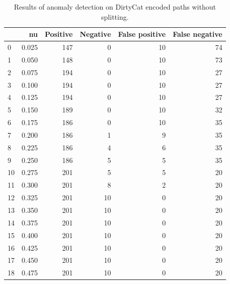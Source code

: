 \documentclass[a4paper,twoside,12pt]{book}
\begin{document}
\begin{appendices}
\begin{table}
	\centering
	\caption{Results of anomaly detection on DirtyCat encoded paths without splitting.}
	\label{id:tab:ocsvmOnDirtyCatFullPaths}
	\begin{tabular}{lrrrrr}
		\toprule
		{} &     nu &  Positive &  Negative &  False positive &  False negative \\
		\midrule
		0  &  0.025 &       147 &         0 &              10 &              74 \\
		1  &  0.050 &       148 &         0 &              10 &              73 \\
		2  &  0.075 &       194 &         0 &              10 &              27 \\
		3  &  0.100 &       194 &         0 &              10 &              27 \\
		4  &  0.125 &       194 &         0 &              10 &              27 \\
		5  &  0.150 &       189 &         0 &              10 &              32 \\
		6  &  0.175 &       186 &         0 &              10 &              35 \\
		7  &  0.200 &       186 &         1 &               9 &              35 \\
		8  &  0.225 &       186 &         4 &               6 &              35 \\
		9  &  0.250 &       186 &         5 &               5 &              35 \\
		10 &  0.275 &       201 &         5 &               5 &              20 \\
		11 &  0.300 &       201 &         8 &               2 &              20 \\
		12 &  0.325 &       201 &        10 &               0 &              20 \\
		13 &  0.350 &       201 &        10 &               0 &              20 \\
		14 &  0.375 &       201 &        10 &               0 &              20 \\
		15 &  0.400 &       201 &        10 &               0 &              20 \\
		16 &  0.425 &       201 &        10 &               0 &              20 \\
		17 &  0.450 &       201 &        10 &               0 &              20 \\
		18 &  0.475 &       201 &        10 &               0 &              20 \\

\end{tabular}
\end{table}
\end{appendices}
\end{document}
